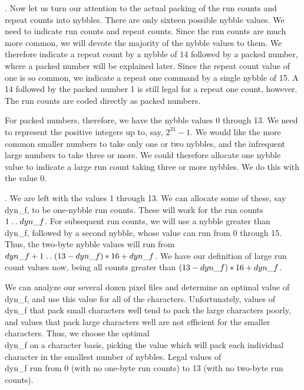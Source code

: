 \fi

. Now let us turn our attention to the actual packing of the run counts and
repeat counts into nybbles.  There are only sixteen possible nybble values.
We need to indicate run counts and repeat counts.  Since the run counts are
much more common, we will devote the majority of the nybble values to them.
We therefore indicate a repeat count by a nybble of 14 followed by a packed
number, where a packed number will be explained later.  Since the repeat
count value of one is so common, we indicate a repeat one command by a single
nybble of 15.  A 14 followed by the packed number 1 is still legal for a
repeat one count, however.  The run counts are coded directly as packed
numbers.

For packed numbers, therefore, we have the nybble values 0 through 13.  We
need to represent the positive integers up to, say, $2^{31}-1$.  We would
like the more common smaller numbers to take only one or two nybbles, and
the infrequent large numbers to take three or more.  We could therefore
allocate one nybble value to indicate a large run count taking three or more
nybbles.  We do this with the value 0.

\fi

. We are left with the values 1 through 13.  We can allocate some of these,
say
\\{dyn\_f}, to be one-nybble run counts.
These will work for the run counts $1\to\\{dyn\_f}$.  For subsequent run
counts, we will use a nybble greater than \\{dyn\_f}, followed by a second
nybble,
whose value can run from 0 through 15.  Thus, the two-byte nybble values will
run from $\\{dyn\_f}+1\to(13-\\{dyn\_f})\ast16+\\{dyn\_f}$.  We have our
definition of large run
count values now, being all counts greater than $(13-\\{dyn\_f})\ast16+\\{dyn%
\_f}$.

We can analyze our several dozen pixel files and determine an optimal value of
\\{dyn\_f}, and use this value for all of the characters.  Unfortunately,
values
of \\{dyn\_f} that pack small characters well tend to pack the large characters
poorly, and values that pack large characters well are not efficient for the
smaller characters.  Thus, we choose the optimal \\{dyn\_f} on a character
basis,
picking the value which will pack each individual character in the smallest
number of nybbles.  Legal values of \\{dyn\_f} run from 0 (with no one-byte run
counts) to 13 (with no two-byte run counts).


